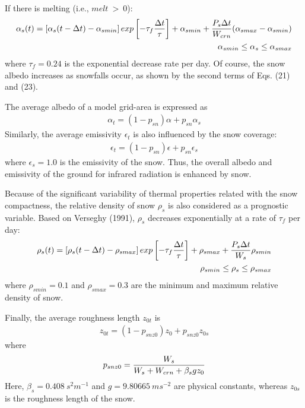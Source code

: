 If there is melting (i.e., $melt \ > \ 0$):
\begin{eqnarray}
\alpha_s (t) = \left[ \alpha_s(t - \Delta t) - \alpha_{smin} \right]
exp \left[ -\tau_f {\Delta t \over \tau } \right]
+ \alpha_{smin}
+ { P_s \Delta t \over W_{crn} } ( \alpha_{smax} - \alpha_{smin} ) \\
\alpha_{smin} \leq \alpha_s \leq \alpha_{smax}
\end{eqnarray}
where $\tau_f=0.24$ is the exponential decrease rate per day.
Of course, the snow albedo increases as snowfalls occur, as shown
by the second terms of Eqs. (21) and (23).

The average albedo of a model grid-area is expressed as
\begin{eqnarray}
\alpha_t = (1-p_{sn}) \alpha + p_{sn} \alpha_s
\end{eqnarray}
Similarly, the average emissivity $\epsilon_t$ is also
influenced by the snow coverage:
\begin{eqnarray}
\epsilon_t = (1-p_{sn}) \epsilon + p_{sn} \epsilon_s
\end{eqnarray}
where $\epsilon_s = 1.0$ is the emissivity of the snow.
Thus, the overall albedo and emissivity of the ground for infrared radiation
is enhanced by snow.

Because of the significant variability of thermal properties related
with the snow compactness,
the relative density of snow $\rho_s$ is also considered
 as a prognostic variable.
Based on Verseghy (1991), $\rho_s$ decreases exponentially at a rate
of $\tau_f$ per day:
\begin{eqnarray}
\rho_s(t)=\left[ \rho_s(t-\Delta t) - \rho_{smax} \right]
exp \left[ -\tau_f {\Delta t \over \tau } \right] + \rho_{smax}
+ {P_s \Delta t \over W_s} \rho_{smin}  \\
\rho_{smin} \leq \rho_s \leq  \rho_{smax}
\end{eqnarray}
where
$\rho_{smin} = 0.1$ and $\rho_{smax} = 0.3$
are the minimum and maximum relative density of snow.

Finally, the average roughness length $z_{0t}$ is
\begin{eqnarray}
z_{0t} = ( 1 - p_{snz0} ) z_0 + p_{snz0} z_{0s}
\end{eqnarray}
where
\begin{eqnarray}
p_{snz0} = { W_s \over W_s + W_{crn} + \beta_s g z_0 }
\end{eqnarray}
Here, $\beta_s = 0.408 \ s^2 m^{-1}$ and $g=9.80665 \ m s^{-2}$ are physical constants,
whereas $z_{0s}$ is the roughness length of the snow.

